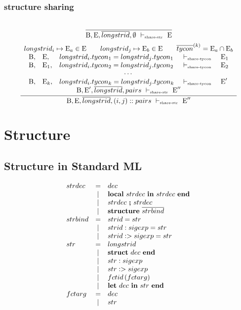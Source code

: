 \documentclass[11pt,a4paper]{article}
\newcommand{\key}[1]{\textrm{\textbf{#1}}}
\newcommand{\End}       {\key{end}}
\newcommand{\Let}       {\key{let}}
\newcommand{\Structure} {\key{structure}}
\newcommand{\Struct}	{\key{struct}}
\newcommand{\In}        {\key{in}}
\newcommand{\Local}     {\key{local}}
\newcommand{\B}  {\textrm{B}}
\newcommand{\E}  {\textrm{E}}
\newcommand{\vdashShareTycon}{\ \vdash_{\textrm{\tiny share-tycon}}\ }
\newcommand{\vdashShareStr}	{\ \vdash_{\textrm{\tiny share-str}}\ }
\begin{document}
\subsubsection {structure sharing}
\[
\cfrac
 {}
 {\B,\E,\overline{longstrid}, \emptyset \vdashShareStr \E}
\]
\[
\cfrac
 {\begin{array}{c}
  longstrid_i \mapsto \E_a \in \E   \qquad
  longstrid_j \mapsto \E_b \in \E   \qquad
  \overline{tycon}^{(k)} = \E_a \cap \E_b \\
  \begin{array}{lllll}
  \B,&\E  ,&longstrid_i.tycon_1 = longstrid_j.tycon_1 &\vdashShareTycon &\E_1 \\
  \B,&\E_1,&longstrid_i.tycon_2 = longstrid_j.tycon_2 &\vdashShareTycon &\E_2 \\
  \multicolumn{5}{c}{\cdots}\\
  \B,&\E_k,&longstrid_i.tycon_k = longstrid_j.tycon_k &\vdashShareTycon &\E'  \\
  \end{array} \\
  \B,\E',\overline{longstrid}, pairs        \vdashShareStr \E''
  \end{array}}
 {\B,\E, \overline{longstrid}, (i,j)::pairs \vdashShareStr \E''}
\]

\section{Structure}
\subsection {Structure in Standard ML}
{\renewcommand{\arraystretch}{1.2}\[
\begin{array}{lcl}
strdec
    & = & dec	                        	\\
    & | & \Local\ strdec\ \In\ strdec\ \End	\\
    & | & strdec\ \key{;}\ strdec			\\
    & | & \Structure\ \overline{strbind}	\\

strbind
    & = & strid = str			\\
    & | & strid :  sigexp = str	\\
    & | & strid :> sigexp = str	\\
    
str 
    & = & longstrid 				\\
    & | & \Struct\ dec\ \End 		\\
    & | & str :  sigexp				\\
    & | & str :> sigexp				\\
    & | & fctid\,(fctarg)			\\
    & | & \Let\ dec\ \In\ str\ \End \\

fctarg
	& = & dec						\\
	& | & str						\\
	    
\end{array}\]}
\end{document}
